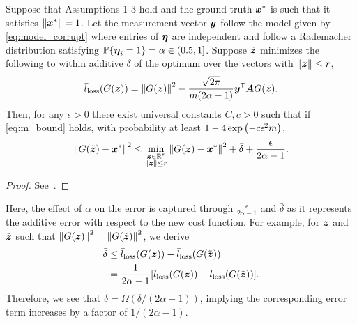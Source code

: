 \documentclass[journal]{IEEEtran}
\begin{document}
\begin{cor}\label{cor:noisy_moremes}
Suppose that Assumptions 1-3 hold and the ground truth $\boldsymbol{x}^*$ is such that it satisfies $\left\Vert\boldsymbol{x}^*\right\Vert = 1$. Let the measurement vector $\boldsymbol{y}$ follow the model given by \eqref{eq:model_corrupt} where entries of $\boldsymbol{\eta}$ are independent and follow a Rademacher distribution satisfying $\mathbb{P}\{\boldsymbol{\eta}_i=1\}=\alpha\in(0.5,1]$. Suppose $\tilde{\boldsymbol{z}}$ minimizes the following to within additive $\bar{\delta}$ of the optimum over the vectors with $\left\Vert \boldsymbol{z}\right\Vert\leq r$,
\begin{equation}
   \bar{l}_{\mathrm{loss}}(G(\boldsymbol{z})) = \left\Vert G(\boldsymbol{z})\right\Vert^2-\frac{\sqrt{2\pi}}{m(2\alpha-1)}\boldsymbol{y}^{\mathsf{T}}\boldsymbol{A} G(\boldsymbol{z}).
\end{equation}
 Then, for any $\epsilon>0$ there exist universal constants $C,c>0$ such that if \eqref{eq:m_bound} holds, with probability at least $1-4\exp\left(-c\epsilon^2 m\right)$, 
\begin{equation}\label{eq:l_bound_noisy_mod}
\left\Vert G(\tilde{\boldsymbol{z}})-\boldsymbol{x}^*\right\Vert^2\leq \underset{\substack{\boldsymbol{z}\in\mathbb{R}^s\\\left\Vert\boldsymbol{z}\right\Vert\leq r}}{\min}\left\Vert G(\boldsymbol{z})-\boldsymbol{x}^*\right\Vert^2+\bar{\delta}+\frac{\epsilon}{2\alpha-1}.
\end{equation}
\end{cor}
\begin{proof}
    See~.
\end{proof}
Here, the effect of $\alpha$ on the error is captured through $\frac{\epsilon}{2\alpha-1}$ and $\bar{\delta}$ as it represents the additive error with respect to the new cost function. For example, for $\boldsymbol{z}$ and $\tilde{\boldsymbol{z}}$ such that $\left\Vert G(\boldsymbol{z})\right\Vert^2=\left\Vert G(\tilde{\boldsymbol{z}})\right\Vert^2$, we derive
\begin{align}
   \bar{\delta}&\leq \bar{l}_{\mathrm{loss}}(G(\boldsymbol{z}))- \bar{l}_{\mathrm{loss}}(G(\tilde{\boldsymbol{z}}))\\
   &=\frac{1}{2\alpha-1}[l_{\mathrm{loss}}(G(\boldsymbol{z}))- l_{\mathrm{loss}}(G(\tilde{\boldsymbol{z}}))].
\end{align}
Therefore, we see that $\bar{\delta}=\Omega(\delta/(2\alpha-1))$, implying the corresponding error term increases by a factor of $1/(2\alpha-1)$.
\end{document}
